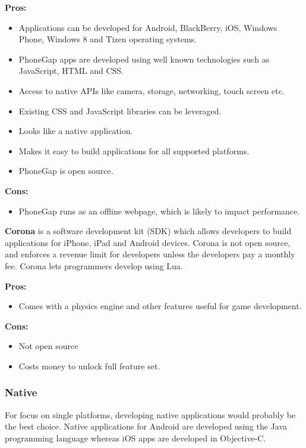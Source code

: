 \indent
  {\bf Pros:}
  \begin{itemize}
    \item Applications can be developed for Android, BlackBerry, iOS,
          Windows Phone, Windows 8 and Tizen operating systems.
    \item PhoneGap apps are developed using well known technologies such as
          JavaScript, HTML and CSS.
    \item Access to native APIs like camera, storage, networking,
          touch screen etc.
    \item Existing CSS and JavaScript libraries can be leveraged.
    \item Looks like a native application.
    \item Makes it easy to build applications for all supported platforms.
    \item PhoneGap is open source.
  \end{itemize}

\indent
{\bf Cons:}
  \begin{itemize}
    \item PhoneGap runs as an offline webpage, which is likely to impact
          performance.
  \end{itemize}

\noindent
{\bf Corona} is a software development kit (SDK) which allows developers to
build applications for iPhone, iPad and Android devices. Corona is not open
source, and enforces a revenue limit for developers unless the developers pay a
monthly fee. Corona lets programmers develop using Lua.

\indent
  {\bf Pros:}
  \begin{itemize}
    \item Comes with a physics engine and other features useful for game
          development.
  \end{itemize}

\indent
  {\bf Cons:}
  \begin{itemize}
    \item Not open source
    \item Costs money to unlock full feature set.
  \end{itemize}

\subsubsection{Native}
For focus on single platforms, developing native applications would probably be
the best choice. Native applications for Android are developed using the Java
programming language whereas iOS apps are developed in Objective-C.

